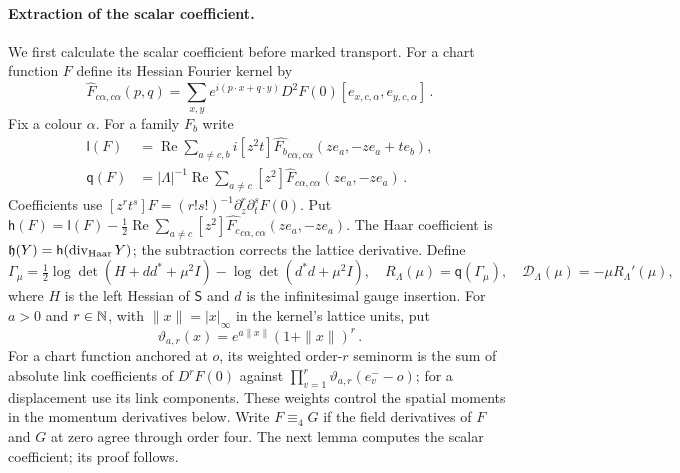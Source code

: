 \paragraph{Extraction of the scalar coefficient.}
We first calculate the scalar coefficient before marked transport. For a chart function $F$ define its Hessian Fourier kernel by
\begin{equation*}
\widehat F_{c\alpha,c\alpha}(p,q)=\sum_{x,y}e^{i(p\cdot x+q\cdot y)}D^2F(0)[e_{x,c,\alpha},e_{y,c,\alpha}]\,.
\end{equation*}
Fix a colour $\alpha$. For a family $F_b$ write
\begin{equation*}
\begin{aligned}
\mathsf l(F)&=\operatorname{Re}\sum_{a\ne c,b}i[z^2t]\widehat{F_b}_{c\alpha,c\alpha}(ze_a,-ze_a+te_b),\\
\mathsf q(F)&=|\Lambda|^{-1}\operatorname{Re}\sum_{a\ne c}[z^2]\widehat F_{c\alpha,c\alpha}(ze_a,-ze_a)\,.
\end{aligned}
\end{equation*}
Coefficients use $[z^rt^s]F=(r!s!)^{-1}\partial_z^r\partial_t^sF(0)$. Put $\mathsf h(F)=\mathsf l(F)-\frac12\operatorname{Re}\sum_{a\ne c}[z^2]\widehat{F_c}_{c\alpha,c\alpha}(ze_a,-ze_a)$. The Haar coefficient is $\mathfrak h(Y)=\mathsf h(\operatorname{div}_{\rm Haar}Y)$; the subtraction corrects the lattice derivative. Define
\begin{equation*}
\Gamma_\mu=\tfrac12\log\det(H+dd^*+\mu^2I)-\log\det(d^*d+\mu^2I),\quad
R_\Lambda(\mu)=\mathsf q(\Gamma_\mu),\quad \mathcal D_\Lambda(\mu)=-\mu R_\Lambda'(\mu),
\end{equation*}
where $H$ is the left Hessian of $\mathsf S$ and $d$ is the infinitesimal gauge insertion.
For $a>0$ and $r\in\mathbb{N}$, with $\|x\|=|x|_\infty$ in the kernel's lattice units, put
\begin{equation*}
\vartheta_{a,r}(x)=e^{a\|x\|}(1+\|x\|)^r\,.
\end{equation*}
For a chart function anchored at $o$, its weighted order-$r$ seminorm is the sum of absolute link coefficients of $D^rF(0)$ against $\prod_{v=1}^r\vartheta_{a,r}(e_v^--o)$; for a displacement use its link components. These weights control the spatial moments in the momentum derivatives below. Write $F\equiv_4G$ if the field derivatives of $F$ and $G$ at zero agree through order four. The next lemma computes the scalar coefficient; its proof follows.
